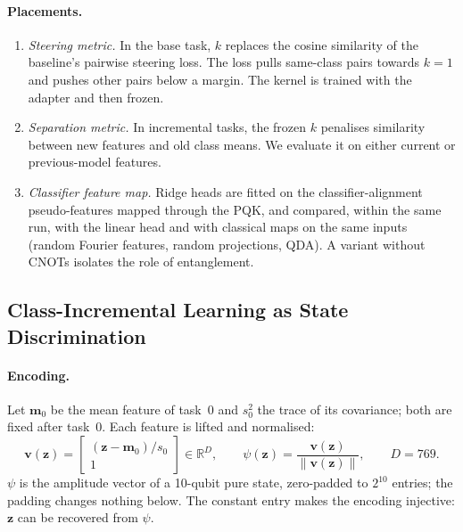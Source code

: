 \paragraph{Placements.}
\begin{enumerate}
  \item \emph{Steering metric.} In the base task, $k$ replaces the cosine
    similarity of the baseline's pairwise steering loss. The loss pulls
    same-class pairs towards $k=1$ and pushes other pairs below a margin.
    The kernel is trained with the adapter and then frozen.
  \item \emph{Separation metric.} In incremental tasks, the frozen $k$
    penalises similarity between new features and old class means. We
    evaluate it on either current or previous-model features.
  \item \emph{Classifier feature map.} Ridge heads are fitted on the
    classifier-alignment pseudo-features mapped through the PQK, and
    compared, within the same run, with the linear head and with classical
    maps on the same inputs (random Fourier features, random projections,
    QDA). A variant without CNOTs isolates the role of entanglement.
\end{enumerate}

\subsection{Class-Incremental Learning as State Discrimination}
\label{sec:qsd}

\paragraph{Encoding.}
Let $\mathbf m_0$ be the mean feature of task~0 and $s_0^2$ the trace of its
covariance; both are fixed after task~0. Each feature is lifted and
normalised:
\begin{equation}
  \mathbf v(\mathbf z)=\begin{bmatrix}(\mathbf z-\mathbf m_0)/s_0\\1\end{bmatrix}\in\mathbb R^{D},\qquad
  \psi(\mathbf z)=\frac{\mathbf v(\mathbf z)}{\|\mathbf v(\mathbf z)\|},\qquad D=769.
  \label{eq:encoding}
\end{equation}
$\psi$ is the amplitude vector of a 10-qubit pure state, zero-padded to
$2^{10}$ entries; the padding changes nothing below. The constant entry makes
the encoding injective: $\mathbf z$ can be recovered from $\psi$.

